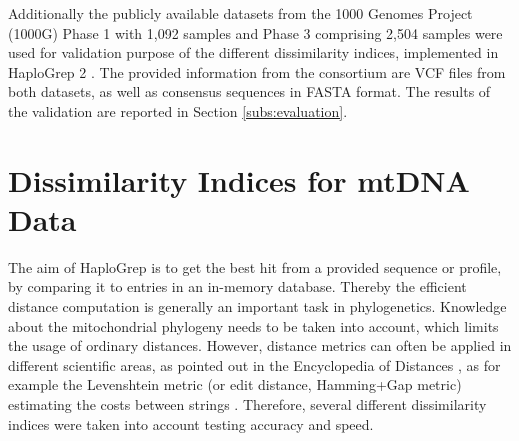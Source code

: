 Additionally the publicly available datasets from the 1000 Genomes Project (1000G) Phase 1 with 1,092 samples and Phase 3 comprising 2,504 samples were used for validation purpose of the different dissimilarity indices, implemented in HaploGrep 2 \cite{Weissensteiner2016a}. The provided information from the consortium are VCF files from both datasets, as well as consensus sequences in FASTA format. The results of the validation are reported in Section \ref{subs:evaluation}. 

\section{Dissimilarity Indices for mtDNA Data}\label{hg:dissimilarity}
\label{subs:distance}
 The aim of HaploGrep is to get the best hit from a provided sequence or profile, by comparing it to entries in an in-memory database. Thereby the efficient distance computation is generally an important task in phylogenetics. Knowledge about the mitochondrial phylogeny needs to be taken into account, which limits the usage of ordinary distances. However, distance metrics can often be applied in different scientific areas, as pointed out in the Encyclopedia of Distances \cite{Deza2009}, as for example the Levenshtein metric (or edit distance, Hamming+Gap metric) estimating the costs between strings  \cite{Deza2009}. Therefore, several different dissimilarity indices were taken into account testing accuracy and speed. 

